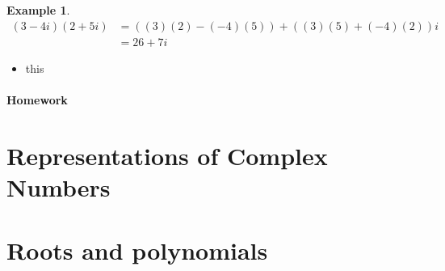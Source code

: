\documentclass[11pt]{article}
\newenvironment{task}
	{\begin{mdframed}[linecolor=lightgray, linewidth=3pt]\raggedright}
	{\end{mdframed}}
\theoremstyle{definition}
\newtheorem{example}[theorem]{Example}
\begin{document}
\begin{example}
  \begin{align*}
    \left( 3-4i \right)\left( 2+5i \right) &= \left( (3)(2)-(-4)(5) \right)+\left( (3)(5)+(-4)(2) \right)i\\
                                           &= 26 + 7i
  \end{align*}
\end{example}

\begin{task}
  \begin{itemize}
    \item this
  \end{itemize}
\end{task}

\newpage
\subsection{Homework}

\newpage

\part{Representations of Complex Numbers}

\part{Roots and polynomials}
\end{document}

